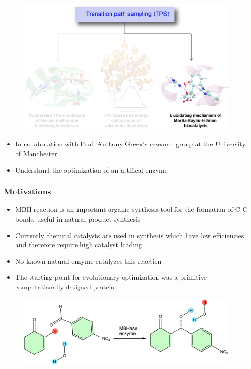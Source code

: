 \documentclass{beamer}
\begin{document}
\begin{frame}
 \begin{figure}
\centering
\includegraphics[scale=0.6]{figures/sree_outline_3.png}
  \end{figure}
  \begin{itemize}[<+-|alert@+>]
        \item In collaboration with Prof. Anthony Green's research group at the University of Manchester
        \item Understand the optimization of an artifical enzyme 
    \end{itemize}
\end{frame}
\begin{frame}
\frametitle{Motivations}
\begin{itemize}[<+-|alert@+>]
\item{MBH reaction is an important organic synthesis tool for the formation of C-C bonds, 
useful in natural product synthesis }
\item{Currently chemical catalysts are used in synthesis which have low efficiencies 
and therefore require high catalyst loading}
\item{No known natural enzyme catalyzes this reaction}
\item The starting point for evolutionary optimization was a primitive computationally 
designed protein 
\end{itemize}
\begin{figure}
\centering
\includegraphics[scale=0.4]{figures/mbh-reaction.png}
\end{figure}
\end{frame}
\end{document}
